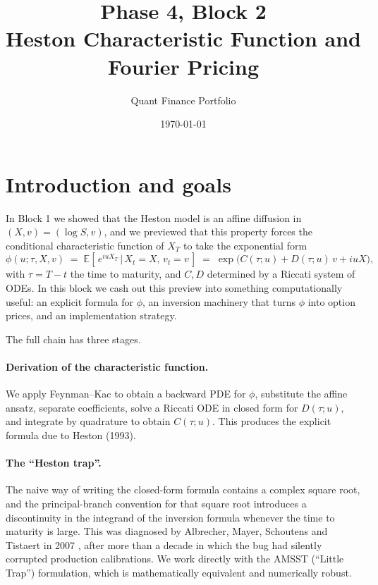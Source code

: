 \documentclass[11pt]{article}
\title{Phase 4, Block 2\\[0.3em]\Large Heston Characteristic Function and Fourier Pricing}
\author{Quant Finance Portfolio}
\date{\today}
\theoremstyle{plain}
\theoremstyle{definition}
\theoremstyle{remark}
\begin{document}
\maketitle
\tableofcontents
\bigskip

\section{Introduction and goals}

In Block 1 we showed that the Heston model is an affine diffusion in \((X, v) = (\log S, v)\), and we previewed that this property forces the conditional characteristic function of \(X_T\) to take the exponential form
\[
    \phi(u; \tau, X, v) \;=\; \mathbb{E}\!\left[\,e^{i u X_T}\,\big|\,X_t = X,\,v_t = v\,\right] \;=\; \exp\!\bigl(C(\tau; u) + D(\tau; u)\,v + i u X\bigr),
\]
with \(\tau = T - t\) the time to maturity, and \(C, D\) determined by a Riccati system of ODEs. In this block we cash out this preview into something computationally useful: an explicit formula for \(\phi\), an inversion machinery that turns \(\phi\) into option prices, and an implementation strategy.

The full chain has three stages.

\paragraph{Derivation of the characteristic function.} We apply Feynman--Kac to obtain a backward PDE for \(\phi\), substitute the affine ansatz, separate coefficients, solve a Riccati ODE in closed form for \(D(\tau; u)\), and integrate by quadrature to obtain \(C(\tau; u)\). This produces the explicit formula due to Heston (1993).

\paragraph{The ``Heston trap''.} The naive way of writing the closed-form formula contains a complex square root, and the principal-branch convention for that square root introduces a discontinuity in the integrand of the inversion formula whenever the time to maturity is large. This was diagnosed by Albrecher, Mayer, Schoutens and Tistaert in 2007 \cite{AMSS2007}, after more than a decade in which the bug had silently corrupted production calibrations. We work directly with the AMSST (``Little Trap'') formulation, which is mathematically equivalent and numerically robust.
\end{document}
